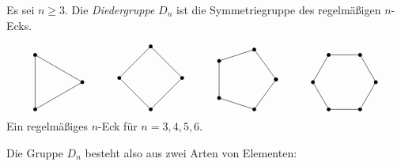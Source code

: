 Es sei $n \geq 3$.
Die \emph{Diedergruppe} $D_n$ ist die Symmetriegruppe des regelmäßigen $n$-Ecks.
\begin{center}
  \[
    \begin{tikzpicture}
      \draw (0:1)
      \foreach \x in {120, 240, 360} {
        -- (\x:1)
      };
      \foreach \x in {120, 240, 360} {
        \fill[black] (\x:1) circle (0.06);
      }
    \end{tikzpicture}
    \hspace{3em}
    \begin{tikzpicture}
      \draw (0:1)
      \foreach \x in {90, 180, 270, 360} {
        -- (\x:1)
      };
      \foreach \x in {90, 180, 270, 360} {
        \fill[black] (\x:1) circle (0.06);
      }
    \end{tikzpicture}
    \hspace{3em}
    \begin{tikzpicture}
      \draw (0:1)
      \foreach \x in {72,144,...,360} {
        -- (\x:1)
      };
      \foreach \x in {0, 72, ..., 360} {
        \fill[black] (\x:1) circle (0.06);
      }
    \end{tikzpicture}
    \hspace{3em}
    \begin{tikzpicture}
      \draw (0:1)
      \foreach \x in {60, 120, ..., 360} {
        -- (\x:1)
      };
      \foreach \x in {60, 120, ..., 360} {
        \fill[black] (\x:1) circle (0.06);
      }
    \end{tikzpicture}
  \]
  Ein regelmäßiges $n$-Eck für $n = 3, 4, 5, 6$.
\end{center}
Die Gruppe $D_n$ besteht also aus zwei Arten von Elementen:
